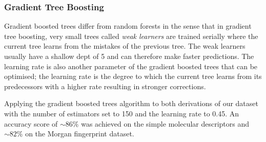 \documentclass[a4paper,12pt]{report}
\begin{document}
			\subsubsection{Gradient Tree Boosting}
			Gradient boosted trees differ from random forests in the sense that in gradient tree boosting, very small trees called \textit{weak learners} are trained serially where the current tree learns from the mistakes of the previous tree. The weak learners usually have a shallow dept of 5 and can therefore make faster predictions. The learning rate is also another parameter of the gradient boosted trees that can be optimised; the learning rate is the degree to which the current tree learns from its predecessors \cite{Mueller2016} with a higher rate resulting in stronger corrections.
			
			Applying the gradient boosted trees algorithm to both derivations of our dataset with
			the number of estimators set to 150 and the learning rate to 0.45. An accuracy score of $\sim86\%$ was achieved on the simple molecular descriptors and $\sim82\%$ on the Morgan fingerprint dataset.
				
		
		
\end{document}
